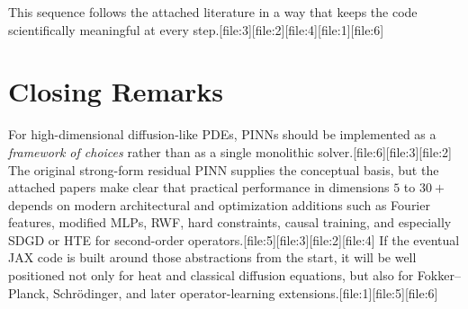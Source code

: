 \documentclass[11pt]{report}
\begin{document}
This sequence follows the attached literature in a way that keeps the code scientifically meaningful at every step.[file:3][file:2][file:4][file:1][file:6]

\chapter*{Closing Remarks}

For high-dimensional diffusion-like PDEs, PINNs should be implemented as a \emph{framework of choices} rather than as a single monolithic solver.[file:6][file:3][file:2]  
The original strong-form residual PINN supplies the conceptual basis, but the attached papers make clear that practical performance in dimensions \(5\) to \(30+\) depends on modern architectural and optimization additions such as Fourier features, modified MLPs, RWF, hard constraints, causal training, and especially SDGD or HTE for second-order operators.[file:5][file:3][file:2][file:4]  
If the eventual JAX code is built around those abstractions from the start, it will be well positioned not only for heat and classical diffusion equations, but also for Fokker--Planck, Schr\"odinger, and later operator-learning extensions.[file:1][file:5][file:6]
\end{document}

